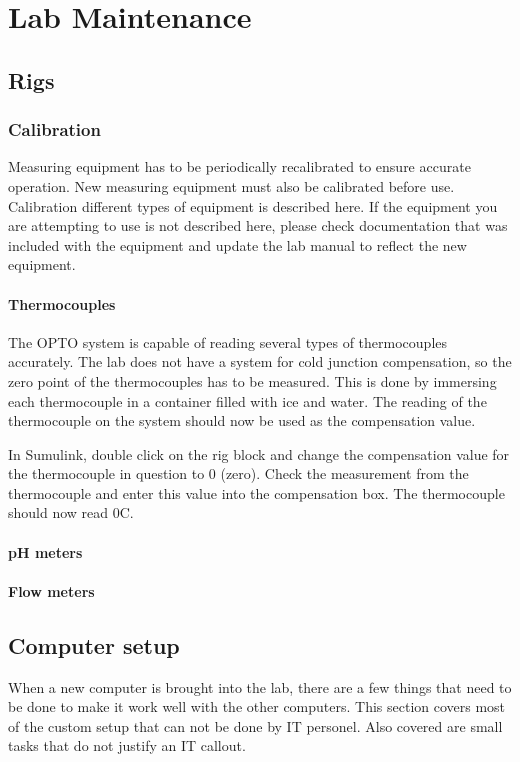 \chapter{Lab Maintenance}
\section{Rigs}
\subsection{Calibration}
Measuring equipment has to be periodically recalibrated to ensure accurate operation.  New measuring equipment must also be calibrated before use.  Calibration different types of equipment is described here.  If the equipment you are attempting to use is not described here, please check documentation that was included with the equipment and update the lab manual to reflect the new equipment.

\subsubsection{Thermocouples}\label{sec:thermocouplecalibration}
The OPTO system is capable of reading several types of thermocouples accurately.  The lab does not have a system for cold junction compensation, so the zero point of the thermocouples has to be measured.  This is done by immersing each thermocouple in a container filled with ice and water.  The reading of the thermocouple on the system should now be used as the compensation value.  

In Sumulink, double click on the rig block and change the compensation value for the thermocouple in question to 0 (zero).  Check the measurement from the thermocouple and enter this value into the compensation box.  The thermocouple should now read 0\deg C.

\subsubsection{pH meters}

\subsubsection{Flow meters}

\section{Computer setup}
When a new computer is brought into the lab, there are a few things that need to be done to make it work well with the other computers.  This section covers most of the custom setup that can not be done by IT personel.  Also covered are small tasks that do not justify an IT callout.

